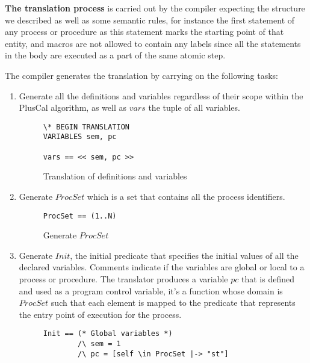 \documentclass{thesul}
\begin{document}
\textbf{The translation process} is carried out by the compiler  expecting the structure we described as well as some semantic rules, for instance the first statement of any process or procedure as this statement marks the starting point of that entity, and macros are not allowed to contain any labels since all the statements in the body are executed as a part of the same atomic step.

The compiler generates the translation by carrying on the following tasks:
\begin{enumerate}

\item Generate all the definitions and variables regardless of their scope within the PlusCal algorithm, as well as $vars$ the tuple of all variables.

\begin{figure}[!h]
\begin{lstlisting}[frame = tlrb, firstnumber = 1,xleftmargin=.2\textwidth, xrightmargin=.2\textwidth]
\* BEGIN TRANSLATION
VARIABLES sem, pc

vars == << sem, pc >>

\end{lstlisting}
\caption{Translation of definitions and variables}
\label{genDefAndVar}
\end{figure} 

\item Generate $ProcSet$ which is a set that contains all the process identifiers.

\begin{figure}[!h]
\begin{lstlisting}[frame = tlrb, firstnumber = 1,xleftmargin=.2\textwidth, xrightmargin=.2\textwidth]
ProcSet == (1..N)

\end{lstlisting}
\caption{Generate $ProcSet$}
\label{GenProcSet}
\end{figure} 

\item  Generate $Init$, the initial predicate that specifies the initial values of all the declared variables. Comments indicate if the variables are global or local to a process or procedure.
The translator produces a variable $pc$ that is defined and used as a program control variable, it's a function whose domain is $ProcSet$ such that each element is mapped to the predicate that represents the entry point of execution for the process.

\begin{figure}[!h]
\begin{lstlisting}[frame = tlrb, firstnumber = 1, xleftmargin=.2\textwidth, xrightmargin=.2\textwidth]
Init == (* Global variables *)
        /\ sem = 1
        /\ pc = [self \in ProcSet |-> "st"]


\end{lstlisting}
\end{figure}
\end{enumerate}
\end{document}
